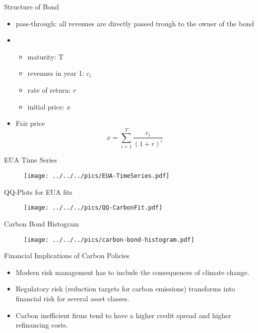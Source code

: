 {Structure of Bond}
\begin{itemize}
\item<1-> pass-through: all revenues are directly passed trough to the owner of the bond
\item<2->
\begin{itemize}
\item maturity: T
\item revenues in year 1: $c_i$
\item rate of return: $r$
\item initial price: $x$
\end{itemize}
\item<3-> Fair price
$$
x= \sum_{i=1}^T \frac{c_i}{(1+r)^i}
$$
\end{itemize}



{EUA Time Series}
\begin{figure}[h!]
\centering
\texttt{[image: ../../../pics/EUA-TimeSeries.pdf]}
\label{fig:EUA-TS}
\end{figure}


{QQ-Plots for EUA fits}
\begin{figure}[h!]
\centering
\texttt{[image: ../../../pics/QQ-CarbonFit.pdf]}
\label{fig:EUA-fits}
\end{figure}


{Carbon Bond Histogram}
\begin{figure}[h!]
\centering
\texttt{[image: ../../../pics/carbon-bond-histogram.pdf]}
\label{fig:Carbon-Bond-Histogram}
\end{figure}





{Financial Implications of Carbon Policies}
\begin{itemize}
\item<1-> Modern risk management has to include the consequences of climate change.
\item<2-> Regulatory risk (reduction targets for carbon emissions) transforms into financial risk  for several asset classes.
\item<3-> Carbon inefficient firms tend to have a higher credit spread and higher refinancing costs.
\end{itemize}



